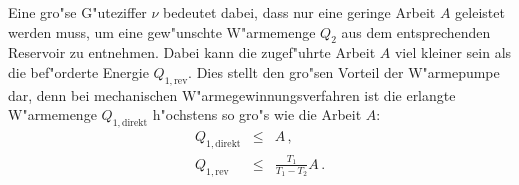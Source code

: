 		Eine gro"se G"uteziffer $\nu$ bedeutet dabei, dass nur eine geringe Arbeit $A$ geleistet werden muss, um eine gew"unschte W"armemenge $Q_2$ aus dem entsprechenden Reservoir zu entnehmen.
		Dabei kann die zugef"uhrte Arbeit $A$ viel kleiner sein als die bef"orderte Energie $Q_{1,\mathrm{rev}}$.
		Dies stellt den gro"sen Vorteil der W"armepumpe dar, denn bei mechanischen W"armegewinnungsverfahren ist die erlangte W"armemenge $Q_{1,\mathrm{direkt}}$ h"ochstens so gro"s wie die Arbeit $A$:
		\begin{eqnarray*}
			Q_{1,\mathrm{direkt}} & \leq & A \,, \\
			Q_{1,\mathrm{rev}} &  \leq & \frac{T_1}{T_1 - T_2} A \,.
		\end{eqnarray*}